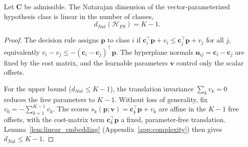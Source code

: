 \begin{theorem}\label{thm:ps_complexity}
    Let $\mathbf{C}$ be admissible. The Natarajan dimension of the vector-param\-eterized hypothesis class is linear in the number of classes,
    \begin{equation}
        d_{Nat}(\mathcal{H}_{PS}) = K - 1.
    \end{equation}
\end{theorem}

\begin{proof}
    The decision rule assigns $\mathbf{p}$ to class $i$ if $\mathbf{c}_i^\top \mathbf{p} + v_i \le \mathbf{c}_j^\top \mathbf{p} + v_j$ for all $j$, equivalently $v_i - v_j \le -(\mathbf{c}_i - \mathbf{c}_j)^\top \mathbf{p}$. The hyperplane normals $\mathbf{n}_{ij} = \mathbf{c}_i - \mathbf{c}_j$ are fixed by the cost matrix, and the learnable parameters $\mathbf{v}$ control only the scalar offsets.

    For the upper bound ($d_{Nat} \leq K-1$), the translation invariance $\sum_k v_k = 0$ reduces the free parameters to $K-1$. Without loss of generality, fix $v_0 = -\sum_{k=1}^{K-1} v_k$. The scores $s_k(\mathbf{p}; \mathbf{v}) = \mathbf{c}_k^\top \mathbf{p} + v_k$ are affine in the $K-1$ free offsets, with the cost-matrix term $\mathbf{c}_k^\top \mathbf{p}$ a fixed, parameter-free translation. Lemma~\ref{lem:linear_embedding} (Appendix~\ref{app:complexity}) then gives $d_{Nat} \leq K - 1$.


\end{proof}
